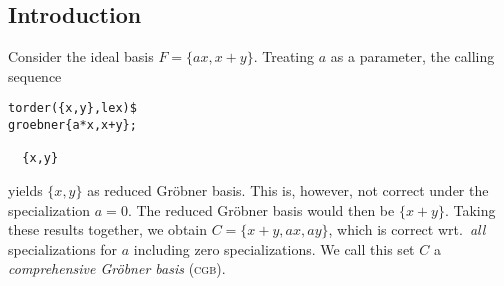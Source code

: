 %
%
% 


\subsection{Introduction}
Consider the ideal basis $F=\{ax,x+y\}$. Treating $a$ as a parameter,
the calling sequence
\begin{verbatim}
torder({x,y},lex)$
groebner{a*x,x+y};

  {x,y}
\end{verbatim}
yields $\{x,y\}$ as reduced Gr\"obner basis. This is, however, not
correct under the specialization $a=0$. The reduced Gr\"obner basis
would then be $\{x+y\}$. Taking these results together, we obtain
$C=\{x+y,ax,ay\}$, which is correct wrt.~\emph{all} specializations for
$a$ including zero specializations. We call this set $C$ a
\emph{comprehensive Gr\"obner basis} (\textsc{cgb}).

